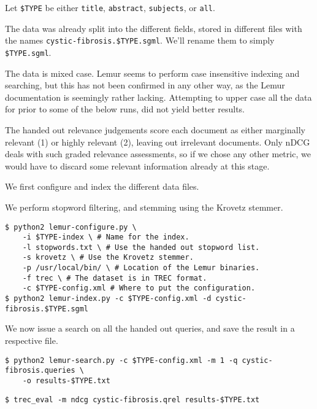 Let \lstinline|$TYPE| be either \lstinline$title$, \lstinline$abstract$,
\lstinline$subjects$, or \lstinline$all$.

The data was already split into the different fields, stored in different files
with the names \lstinline|cystic-fibrosis.$TYPE.sgml|. We'll rename them to
simply \lstinline|$TYPE.sgml|.

The data is mixed case. Lemur seems to perform case insensitive indexing and
searching, but this has not been confirmed in any other way, as the Lemur
documentation is seemingly rather lacking. Attempting to upper case all the
data for prior to some of the below runs, did not yield better results.

The handed out relevance judgements score each document as either marginally
relevant (1) or highly relevant (2), leaving out irrelevant documents. Only
nDCG deals with such graded relevance assessments, so if we chose any other
metric, we would have to discard some relevant information already at this
stage.


We first configure and index the
different data files.

We perform stopword filtering, and stemming using the
Krovetz stemmer.

\begin{lstlisting}
$ python2 lemur-configure.py \
    -i $TYPE-index \ # Name for the index.
    -l stopwords.txt \ # Use the handed out stopword list.
    -s krovetz \ # Use the Krovetz stemmer.
    -p /usr/local/bin/ \ # Location of the Lemur binaries.
    -f trec \ # The dataset is in TREC format.
    -c $TYPE-config.xml # Where to put the configuration.
$ python2 lemur-index.py -c $TYPE-config.xml -d cystic-fibrosis.$TYPE.sgml
\end{lstlisting}

We now issue a search on all the handed out queries, and save the result in a
respective file.

\begin{lstlisting}
$ python2 lemur-search.py -c $TYPE-config.xml -m 1 -q cystic-fibrosis.queries \
    -o results-$TYPE.txt
\end{lstlisting}

\begin{lstlisting}
$ trec_eval -m ndcg cystic-fibrosis.qrel results-$TYPE.txt
\end{lstlisting}


